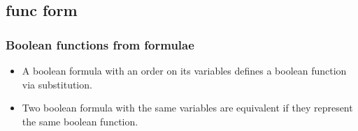 \documentclass{beamer}
\begin{document}



\subsection[func \gets form]{func \gets form}

\begin{frame}
\frametitle{Boolean functions from formulae}
\begin{itemize}
\item A boolean formula with an order on its variables defines a boolean function via substitution.
\pause
\item Two boolean formula with the same variables are equivalent if they represent the same boolean function.
\end{itemize}
\end{frame}
\end{document}
